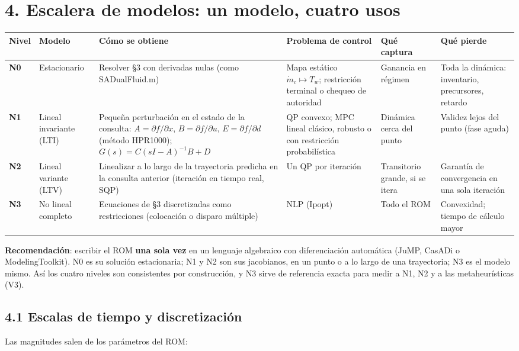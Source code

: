 \documentclass[11pt,a4paper]{article}
\newcommand{\codeus}{\textunderscore\allowbreak}
\newcommand{\code}[1]{{\small\ttfamily\let\_\codeus #1}}
\begin{document}
\section*{4. Escalera de modelos: un modelo, cuatro usos}
{\footnotesize
\begin{xltabular}{\linewidth}{@{}YYYYYY@{}}
\toprule
\textbf{Nivel} & \textbf{Modelo} & \textbf{Cómo se obtiene} & \textbf{Problema de control} & \textbf{Qué captura} & \textbf{Qué pierde} \\
\midrule
\endhead
\textbf{N0} & Estacionario & Resolver \S{}3 con derivadas nulas (como \code{SA\_DualFluid.m}) & Mapa estático $\dot m_c\mapsto T_w$; restricción terminal o chequeo de autoridad & Ganancia en régimen & Toda la dinámica: inventario, precursores, retardo \\
\textbf{N1} & Lineal invariante (LTI) & Pequeña perturbación en el estado de la consulta: $A=\partial f/\partial x$, $B=\partial f/\partial u$, $E=\partial f/\partial d$ (método HPR1000); $G(s)=C(sI-A)^{-1}B+D$ & QP convexo; MPC lineal clásico, robusto o con restricción probabilística & Dinámica cerca del punto & Validez lejos del punto (fase aguda) \\
\textbf{N2} & Lineal variante (LTV) & Linealizar a lo largo de la trayectoria predicha en la consulta anterior (iteración en tiempo real, SQP) & Un QP por iteración & Transitorio grande, si se itera & Garantía de convergencia en una sola iteración \\
\textbf{N3} & No lineal completo & Ecuaciones de \S{}3 discretizadas como restricciones (colocación o disparo múltiple) & NLP (Ipopt) & Todo el ROM & Convexidad; tiempo de cálculo mayor \\
\bottomrule
\end{xltabular}}

\textbf{Recomendación}: escribir el ROM \textbf{una sola vez} en un lenguaje algebraico con diferenciación automática (JuMP, CasADi o ModelingToolkit). N0 es su solución estacionaria; N1 y N2 son sus jacobianos, en un punto o a lo largo de una trayectoria; N3 es el modelo mismo. Así los cuatro niveles son consistentes por construcción, y N3 sirve de referencia exacta para medir a N1, N2 y a las metaheurísticas (V3).

\subsection*{4.1 Escalas de tiempo y discretización}
Las magnitudes salen de los parámetros del ROM:
\end{document}
